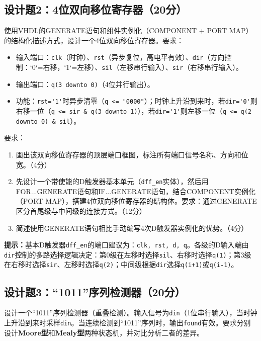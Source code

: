 \subsection*{设计题2：4位双向移位寄存器（20分）}

使用VHDL的GENERATE语句和组件实例化（COMPONENT + PORT MAP）的结构化描述方式，设计一个4位双向移位寄存器。要求：

\begin{itemize}
  \item 输入端口：\verb|clk|（时钟）、\verb|rst|（异步复位，高电平有效）、\verb|dir|（方向控制：`0`=右移，`1`=左移）、\verb|sil|（左移串行输入）、\verb|sir|（右移串行输入）。
  \item 输出端口：\verb|q(3 downto 0)|（4位并行输出）。
  \item 功能：\verb|rst='1'|时异步清零（\verb|q <= "0000"|）；时钟上升沿到来时，若\verb|dir='0'|则右移一位（\verb|q <= sir & q(3 downto 1)|），若\verb|dir='1'|则左移一位（\verb|q <= q(2 downto 0) & sil|）。
\end{itemize}

要求：

\begin{enumerate}[label=(\arabic*)]
  \item 画出该双向移位寄存器的顶层端口框图，标注所有端口信号名称、方向和位宽。（4分）
  \item 先设计一个带使能的D触发器基本单元（\verb|dff_en|实体），然后用FOR...GENERATE语句和IF...GENERATE语句，结合COMPONENT实例化（PORT MAP），搭建4位双向移位寄存器的结构体。要求：通过GENERATE区分首尾级与中间级的连接方式。（12分）
  \item 简述使用GENERATE语句相比手动编写4次D触发器实例化的优势。（4分）
\end{enumerate}

\begin{framed}
\textbf{提示：}基本D触发器\verb|dff_en|的端口建议为：\verb|clk, rst, d, q|。各级的D输入端由\verb|dir|控制的多路选择逻辑决定：第0级在左移时选择\verb|sil|、右移时选择\verb|q(1)|；第3级在右移时选择\verb|sir|、左移时选择\verb|q(2)|；中间级根据\verb|dir|选择\verb|q(i+1)|或\verb|q(i-1)|。
\end{framed}

\subsection*{设计题3：``1011''序列检测器（20分）}

设计一个``1011''序列检测器（重叠检测）。输入信号为\verb|din|（1位串行输入），当时钟上升沿到来时采样\verb|din|。当连续检测到``1011''序列时，输出\verb|found|有效。要求分别设计\textbf{Moore型}和\textbf{Mealy型}两种状态机，并对比分析二者的差异。

